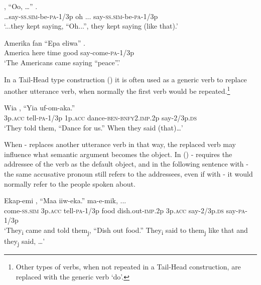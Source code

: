 \ea%
\label{ex:x323}
\gll {\dots}, ``Oo, {\dots}'' . \\
{\dots}say-\textsc{ss}.\textsc{sim}-be-\textsc{pa}-1/3p oh ... say-\textsc{ss}.\textsc{sim}-be-\textsc{pa}-1/3p \\
\glt`...they kept saying, ``Oh...'', they kept saying (like that).'
\z

\ea%
\label{ex:x942}
\gll Amerika fan ``Epa eliwa'' . \\
America here time good say-come-\textsc{pa}-1/3p\\
\glt`The Americans came saying ``peace''.'
\z

In a Tail-Head type construction () it is often used as a generic verb to replace another utterance verb, when normally the first verb would be repeated.\footnote{Other types of verbs, when not repeated in a Tail-Head construction, are replaced with the generic verb  `do'.} 

\ea%
\label{ex:x324}
\gll Wia , ``Yia uf-om-aka.'' \\
3p.\textsc{acc} tell-\textsc{pa}-1/3p 1p.\textsc{acc} dance-\textsc{ben}-\textsc{bnfy}2.\textsc{imp}.2p say-2/3p.\textsc{ds}\\
\glt`They told them, ``Dance for us.'' When they said (that){\dots}'
\z

When - replaces another utterance verb in that way, the replaced verb may influence what semantic argument becomes the object. In () - requires the addressee of the verb as the default object, and in the following sentence with - the same accusative pronoun \textit{ }still refers to the addressees, even if with - it would normally refer to the people spoken about.

\ea%
\label{ex:x325}
\gll Ekap-emi  , ``Maa iiw-eka.''   ma-e-mik, ...\\
come-\textsc{ss}.\textsc{sim} 3p.\textsc{acc} tell-\textsc{pa}-1/3p food dish.out-\textsc{imp}.2p 3p.\textsc{acc} say-2/3p.\textsc{ds} say-\textsc{pa}-1/3p\\
\glt`They\textsubscript{i} came and told them\textsubscript{j}, ``Dish out food.'' They\textsubscript{i} said to them\textsubscript{j} like that and they\textsubscript{j} said, {\dots}'
\z

